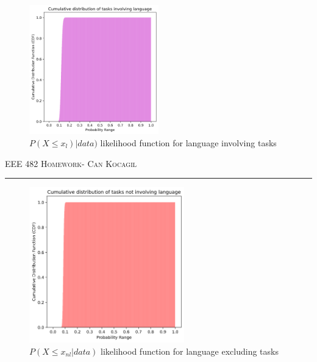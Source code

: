 \documentclass[12pt]{amsart}
\begin{document}
 \begin{figure}[h]
    \centering
    \includegraphics[width = 0.5\textwidth]{images/5.png}
    \caption{$P(X\leq x_{l})|data)$ likelihood function for language involving tasks }
\end{figure}

\newpage
{\scshape EEE 482} \hfill {\scshape \large  Homework-\relax} \hfill {\scshape Can Kocagil}
\smallskip
\hrule
\begin{figure}[h]
    \centering
    \includegraphics[width = 0.6\textwidth]{images/6.png}
    \caption{$P(X\leq x_{nl}|data)$ likelihood function for language excluding tasks  }
\end{figure}
\end{document}
